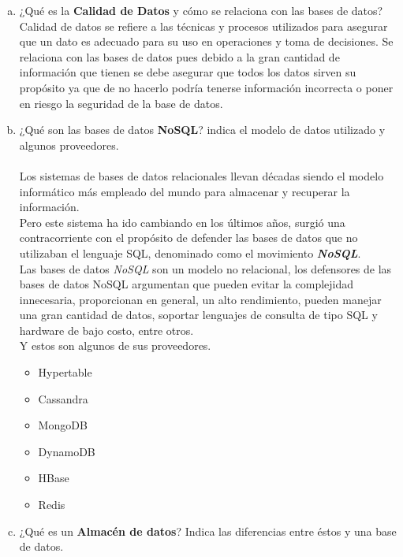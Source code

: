 \documentclass[letterpaper,12pt]{article}
\begin{document}
            \begin{enumerate}[a)]

            \item ¿Qué es la \textbf{Calidad de Datos} y cómo se relaciona con las bases de datos? \\
        	Calidad de datos se refiere a las técnicas y procesos utilizados para asegurar que un dato es adecuado para su uso en operaciones y toma de decisiones. Se relaciona con las bases de datos pues debido a la gran cantidad de información que tienen se debe asegurar que todos los datos sirven su propósito ya que de no hacerlo podría tenerse información incorrecta o poner en riesgo la seguridad de la base de datos.

            \item ¿Qué son las bases de datos \textbf{NoSQL}? indica el modelo de datos utilizado y algunos proveedores.\\\\

         Los sistemas de bases de datos relacionales llevan décadas siendo el modelo informático más empleado del mundo para almacenar y recuperar la información.\\

         Pero este sistema ha ido cambiando en los últimos años, surgió una contracorriente con el propósito de defender las bases de datos que no utilizaban el lenguaje SQL, denominado como el movimiento \textbf{\textit{ NoSQL}}. \\

         Las bases de datos \textit{NoSQL} son un modelo no relacional, los defensores de las bases de datos NoSQL argumentan que pueden evitar la complejidad innecesaria, proporcionan en general, un alto rendimiento, pueden manejar una gran cantidad de datos, soportar lenguajes de consulta de tipo SQL y hardware de bajo costo, entre otros.\\

          Y estos son algunos de sus proveedores.
          \begin{itemize}
            \item Hypertable
            \item Cassandra
            \item MongoDB
            \item DynamoDB
            \item HBase
            \item Redis

          \end{itemize}




            \item ¿Qué es un \textbf{Almacén de datos}? Indica las diferencias entre éstos y una base de datos.

            \end{enumerate}
\end{document}
